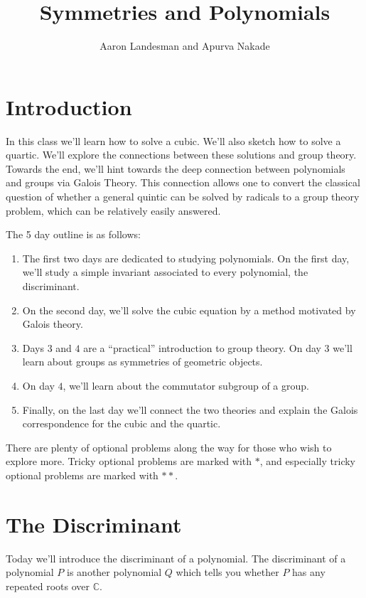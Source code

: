 \documentclass[reqno, 12pt, letter]{article}
\title{Symmetries and Polynomials}
\author{Aaron Landesman and Apurva Nakade}
\theoremstyle{plain}
\theoremstyle{definition}
\theoremstyle{remark}
\numberwithin{equation}{section}
\newcommand\bc{{\mathbb C}}
\begin{document}
\maketitle


\section*{Introduction}
In this class we'll learn how to solve a cubic. We'll also sketch how to solve a quartic. We'll explore the connections between these solutions and group theory.
Towards the end, we'll hint towards the deep connection between polynomials and groups via Galois Theory. This connection allows one to convert the classical question of whether a general quintic can be solved by radicals to a group theory problem, which can be relatively easily answered.

The 5 day outline is as follows:
\begin{enumerate}
	\item The first two days are dedicated to studying polynomials. On the first day, we'll study a simple invariant associated to every polynomial, the discriminant.
	\item On the second day, we'll solve the cubic equation by a method motivated by Galois theory.
	\item Days $3$ and $4$ are a ``practical'' introduction to group theory. On day $3$ we'll learn about groups as symmetries of geometric objects.
	\item On day $4$, we'll learn about the commutator subgroup of a group.
	\item Finally, on the last day we'll connect the two theories and explain the Galois correspondence for the cubic and the quartic.
\end{enumerate}
There are plenty of optional problems along the way for those who wish to explore more.
Tricky optional problems are marked with $*$, and especially tricky optional problems are marked with $**$.

\newpage
\section{The Discriminant}
Today we'll introduce the discriminant of a polynomial. The discriminant of a polynomial $P$ is another polynomial $Q$ which tells you
whether $P$ has any repeated roots over $\bc$.
\end{document}
